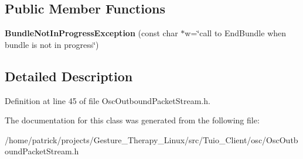 \subsection*{Public Member Functions}
\begin{DoxyCompactItemize}
\item 
\mbox{\label{classosc_1_1_bundle_not_in_progress_exception_a3ad748050448ad0ef2414440af5e6f9b}} 
{\bfseries Bundle\+Not\+In\+Progress\+Exception} (const char $\ast$w=\char`\"{}call to End\+Bundle when bundle is not in progress\char`\"{})
\end{DoxyCompactItemize}


\subsection{Detailed Description}


Definition at line 45 of file Osc\+Outbound\+Packet\+Stream.\+h.



The documentation for this class was generated from the following file\+:\begin{DoxyCompactItemize}
\item 
/home/patrick/projects/\+Gesture\+\_\+\+Therapy\+\_\+\+Linux/src/\+Tuio\+\_\+\+Client/osc/Osc\+Outbound\+Packet\+Stream.\+h\end{DoxyCompactItemize}
